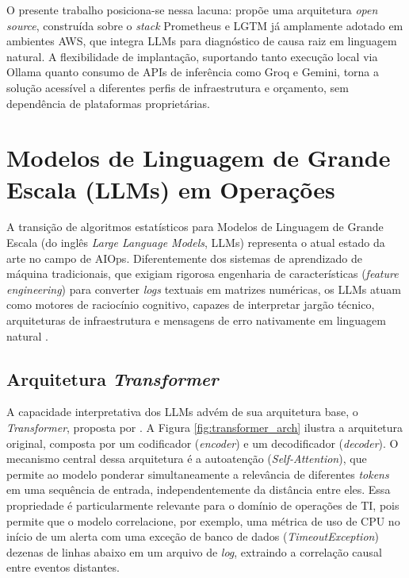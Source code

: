 O presente trabalho posiciona-se nessa lacuna: propõe uma arquitetura \textit{open source}, construída sobre o \textit{stack} Prometheus e LGTM já amplamente adotado em ambientes AWS, que integra LLMs para diagnóstico de causa raiz em linguagem natural. A flexibilidade de implantação, suportando tanto execução local via Ollama quanto consumo de APIs de inferência como Groq e Gemini, torna a solução acessível a diferentes perfis de infraestrutura e orçamento, sem dependência de plataformas proprietárias.

\section{Modelos de Linguagem de Grande Escala (LLMs) em Operações}
\label{sec:llms}

A transição de algoritmos estatísticos para Modelos de Linguagem de Grande Escala (do inglês \textit{Large Language Models}, LLMs) representa o atual estado da arte no campo de AIOps. Diferentemente dos sistemas de aprendizado de máquina tradicionais, que exigiam rigorosa engenharia de características (\textit{feature engineering}) para converter \textit{logs} textuais em matrizes numéricas, os LLMs atuam como motores de raciocínio cognitivo, capazes de interpretar jargão técnico, arquiteturas de infraestrutura e mensagens de erro nativamente em linguagem natural \cite{ahmed2023recommending}.

\subsection{Arquitetura \textit{Transformer}}

A capacidade interpretativa dos LLMs advém de sua arquitetura base, o \textit{Transformer}, proposta por . A Figura \ref{fig:transformer_arch} ilustra a arquitetura original, composta por um codificador (\textit{encoder}) e um decodificador (\textit{decoder}). O mecanismo central dessa arquitetura é a autoatenção (\textit{Self-Attention}), que permite ao modelo ponderar simultaneamente a relevância de diferentes \textit{tokens} em uma sequência de entrada, independentemente da distância entre eles. Essa propriedade é particularmente relevante para o domínio de operações de TI, pois permite que o modelo correlacione, por exemplo, uma métrica de uso de CPU no início de um alerta com uma exceção de banco de dados (\textit{TimeoutException}) dezenas de linhas abaixo em um arquivo de \textit{log}, extraindo a correlação causal entre eventos distantes.

